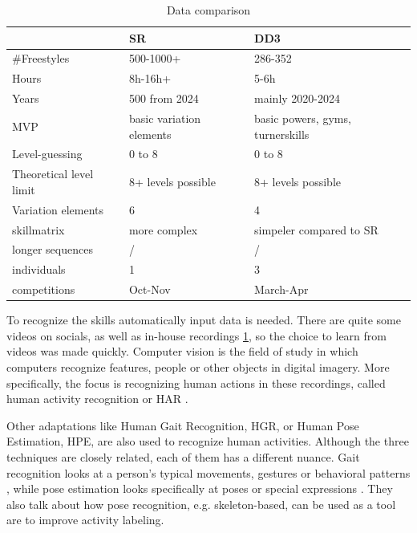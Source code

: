 \begin{table}[t]
    \centering
    \begin{tabular}{|l|l|l|}
        \hline
        & SR & DD3 \\ \hline
        \#Freestyles & 500-1000+ & 286-352 \\ \hline
        Hours & 8h-16h+ & 5-6h \\ \hline
        Years & 500 from 2024 & mainly 2020-2024 \\ \hline
        MVP & basic variation elements & basic powers, gyms, turnerskills \\ \hline
        Level-guessing & 0 to 8 & 0 to 8 \\ \hline
        Theoretical level limit & 8+ levels possible & 8+ levels possible \\ \hline
        Variation elements & 6 & 4 \\ \hline
        skillmatrix & more complex & simpeler compared to SR \\ \hline
        longer sequences & / & / \\ \hline
        individuals & 1 & 3 \\ \hline
        competitions & Oct-Nov & March-Apr \\ \hline
    \end{tabular}
    \caption{Data comparison}
    \label{tbl:data-comparison}
\end{table}

To recognize the skills automatically input data is needed. There are quite some videos on socials, as well as in-house recordings \ref{tbl:data-comparison}, so the choice to learn from videos was made quickly. Computer vision is the field of study in which computers recognize features, people or other objects in digital imagery. More specifically, the focus is recognizing human actions in these recordings, called human activity recognition or HAR \autocite{Pareek_2020}.

Other adaptations like Human Gait Recognition, HGR, or Human Pose Estimation, HPE, are also used to recognize human activities. Although the three techniques are closely related, each of them has a different nuance. Gait recognition looks at a person's typical movements, gestures or behavioral patterns \autocite{Alharthi_2019}, while pose estimation looks specifically at poses or special expressions \autocite{Song_2021}. They also talk about how pose recognition, e.g. skeleton-based, can be used as a tool are to improve activity labeling.

